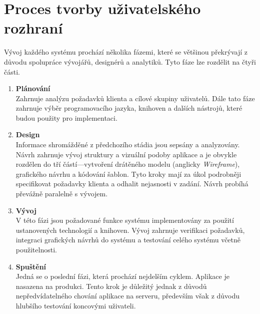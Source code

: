 \chapter{Proces tvorby uživatelského rozhraní}
\label{chap:process}

\begin{quote}
\end{quote}

\noindent
Vývoj každého systému prochází několika fázemi, které se většinou překrývají z důvodu spolupráce vývojářů, designérů a analytiků. Tyto fáze lze rozdělit na čtyři části.

\begin{enumerate}[leftmargin=1cm]
    \item \textbf{Plánování}\\
          Zahrnuje analýzu požadavků klienta a cílové skupiny uživatelů. Dále tato fáze zahrnuje výběr programovacího jazyka, knihoven a dalších nástrojů, které budou použity pro implementaci.

    \item \textbf{Design}\\
          Informace shromážděné z předchozího stádia jsou sepsány a analyzovány. Návrh zahrnuje vývoj struktury a vizuální podoby aplikace a je obvykle rozdělen do tří částí---vytvoření drátěného modelu (anglicky \textit{Wireframe}), grafického návrhu a kódování šablon. Tyto kroky mají za úkol podrobněji specifikovat požadavky klienta a odhalit nejasnosti v zadání. Návrh probíhá převážně paralelně s vývojem.

    \item \textbf{Vývoj}\\
          V této fázi jsou požadované funkce systému implementovány za použití ustanovených technologií a knihoven. Vývoj zahrnuje verifikaci požadavků, integraci grafických návrhů do systému a testování celého systému včetně použitelnosti.

    \item \textbf{Spuštění}\\
           Jedná se o poslední fázi, která prochází nejdelším cyklem. Aplikace je nasazena na produkci. Tento krok je důležitý jednak z důvodů nepředvídatelného chování aplikace na serveru, především však z důvodu hlubšího testování koncovými uživateli.

\end{enumerate}

